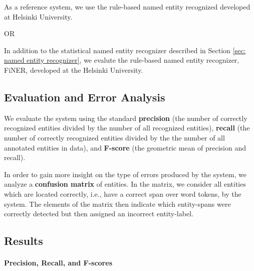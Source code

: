 \documentclass[11pt]{article}
\begin{document}
As a reference system, we use the rule-based named entity recognized developed at Helsinki University.  

OR 

In addition to the statistical named entity recognizer described in Section \ref{sec: named entity recognizer}, we evalute the rule-based named entity recognizer, FiNER, developed at the Helsinki University.


\subsection{Evaluation and Error Analysis}
\label{sec: evaluation}

We evaluate the system using the standard \textbf{precision} (the number of correctly recognized entities divided by the number of all recognized entities), \textbf{recall} (the number of correctly recognized entities divided by the the number of all annotated entities in data), and \textbf{F-score} (the geometric mean of precision and recall).

In order to gain more insight on the type of errors produced by the system, we analyze a \textbf{confusion matrix} of entities. In the matrix, we consider all entities which are located correctly, i.e., have a correct span over word tokens, by the system. The elements of the matrix then indicate which entity-spans were correctly detected but then assigned an incorrect entity-label. 



\subsection{Results}
\label{sec: results}


\paragraph{Precision, Recall, and F-scores}
\end{document}
